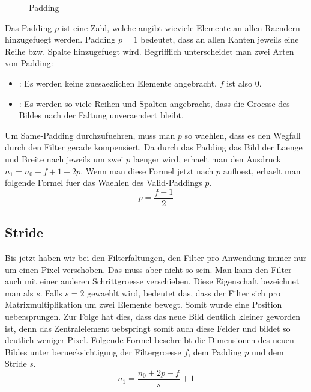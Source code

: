 \begin{figure}[h!]

  \caption{Padding}
\end{figure}

Das Padding $p$ ist eine Zahl, welche angibt wieviele Elemente an allen Raendern
hinzugefuegt werden. Padding $p = 1$ bedeutet, dass an allen Kanten jeweils eine
Reihe bzw. Spalte hinzugefuegt wird.
Begrifflich unterscheidet man zwei Arten von Padding:
\begin{itemize}
\item{: Es werden keine zuesaezlichen Elemente angebracht. $f$ ist also 0.}
\item{: Es werden so viele Reihen und Spalten angebracht, dass
    die Groesse des Bildes nach der Faltung unveraendert bleibt.}
\end{itemize}
\para{}
Um Same-Padding durchzufuehren, muss man $p$ so waehlen, dass es den Wegfall durch
den Filter gerade kompensiert. Da durch das Padding das Bild der Laenge und
Breite nach jeweils um zwei $p$ laenger wird, erhaelt man den Ausdruck $n_1 =
n_0 - f + 1 + 2p$. Wenn man diese Formel jetzt nach $p$ aufloest,
erhaelt man folgende Formel fuer das Waehlen des Valid-Paddings $p$.
\\
\begin{equation}
  p = \frac{f-1}{2}
\end{equation}

\subsection{Stride}
Bis jetzt haben wir bei den Filterfaltungen, den Filter pro Anwendung immer nur
um einen Pixel verschoben. Das muss aber nicht so sein. Man kann den Filter
auch mit einer anderen Schrittgroesse verschieben. Diese Eigenschaft bezeichnet
man als  $s$. Falls $s = 2$ gewaehlt wird, bedeutet das, dass der
Filter sich pro Matrixmultiplikation um zwei Elemente bewegt. Somit wurde eine
Position uebersprungen. Zur Folge hat dies, dass das neue Bild
deutlich kleiner geworden ist, denn das Zentralelement uebspringt somit auch
diese Felder und bildet so deutlich weniger Pixel.
\para{}
Folgende Formel beschreibt die Dimensionen des neuen Bildes unter
beruecksichtigung der Filtergroesse $f$, dem Padding $p$ und dem Stride $s$.
\\
\begin{equation}
  n_1 = \frac{n_0 + 2p - f}{s} + 1
\end{equation}


